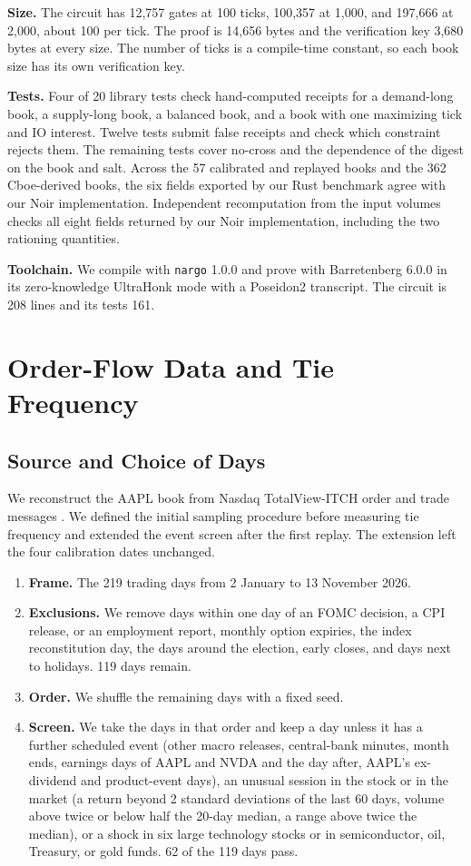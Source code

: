 \textbf{Size.} The circuit has 12,757 gates at 100 ticks, 100,357 at 1,000, and 197,666 at 2,000, about 100 per tick. The proof is 14,656 bytes and the verification key 3,680 bytes at every size. The number of ticks is a compile-time constant, so each book size has its own verification key.

\textbf{Tests.} Four of 20 library tests check hand-computed receipts for a demand-long book, a supply-long book, a balanced book, and a book with one maximizing tick and IO interest. Twelve tests submit false receipts and check which constraint rejects them. The remaining tests cover no-cross and the dependence of the digest on the book and salt. Across the 57 calibrated and replayed books and the 362 Cboe-derived books, the six fields exported by our Rust benchmark agree with our Noir implementation. Independent recomputation from the input volumes checks all eight fields returned by our Noir implementation, including the two rationing quantities.

\textbf{Toolchain.} We compile with \texttt{nargo} 1.0.0 and prove with Barretenberg 6.0.0 in its zero-knowledge UltraHonk mode with a Poseidon2 transcript. The circuit is 208 lines and its tests 161.

\section{Order-Flow Data and Tie Frequency}
\label{app:zq-data}

\subsection{Source and Choice of Days}

We reconstruct the AAPL book from Nasdaq TotalView-ITCH order and trade messages \cite{itch}. We defined the initial sampling procedure before measuring tie frequency and extended the event screen after the first replay. The extension left the four calibration dates unchanged.

\begin{enumerate}
\item \textbf{Frame.} The 219 trading days from 2 January to 13 November 2026.
\item \textbf{Exclusions.} We remove days within one day of an FOMC decision, a CPI release, or an employment report, monthly option expiries, the index reconstitution day, the days around the election, early closes, and days next to holidays. 119 days remain.
\item \textbf{Order.} We shuffle the remaining days with a fixed seed.
\item \textbf{Screen.} We take the days in that order and keep a day unless it has a further scheduled event (other macro releases, central-bank minutes, month ends, earnings days of AAPL and NVDA and the day after, AAPL's ex-dividend and product-event days), an unusual session in the stock or in the market (a return beyond 2 standard deviations of the last 60 days, volume above twice or below half the 20-day median, a range above twice the median), or a shock in six large technology stocks or in semiconductor, oil, Treasury, or gold funds. 62 of the 119 days pass.
\end{enumerate}

